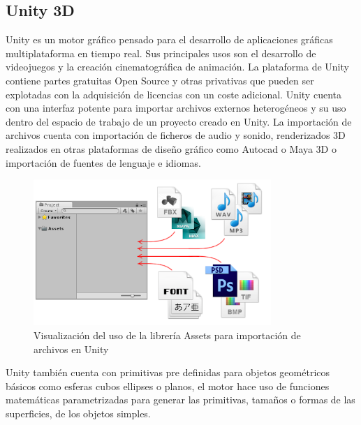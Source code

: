 \documentclass[a4paper]{book}
\begin{document}
\subsection{Unity 3D}
\label{subsec:Unity3D}

Unity es un motor gráfico pensado para el desarrollo de aplicaciones gráficas multiplataforma en tiempo
real. Sus principales usos son el desarrollo de videojuegos y la creación cinematográfica de animación.
La plataforma de Unity contiene partes gratuitas Open Source y otras privativas que pueden ser explotadas
con la adquisición de licencias con un coste adicional. Unity cuenta con una interfaz potente para importar archivos
externos heterogéneos y su uso dentro del espacio de trabajo de un proyecto creado en Unity. La importación de
archivos cuenta con importación de ficheros de audio y sonido, renderizados 3D realizados en otras plataformas de diseño gráfico como
Autocad o Maya 3D o importación de fuentes de lenguaje e idiomas.

\begin{figure}[H]
    \centering
    \includegraphics[width=9cm, keepaspectratio]{img/unity_assets.png}
    \caption{Visualización del uso de la librería Assets para importación de archivos en Unity}
    \label{unity_assets}
\end{figure}

Unity también cuenta con primitivas pre definidas para objetos geométricos básicos como esferas cubos
ellipses o planos, el motor hace uso de funciones matemáticas parametrizadas para generar las primitivas, tamaños o formas de las
superficies, de los objetos simples.
\end{document}
